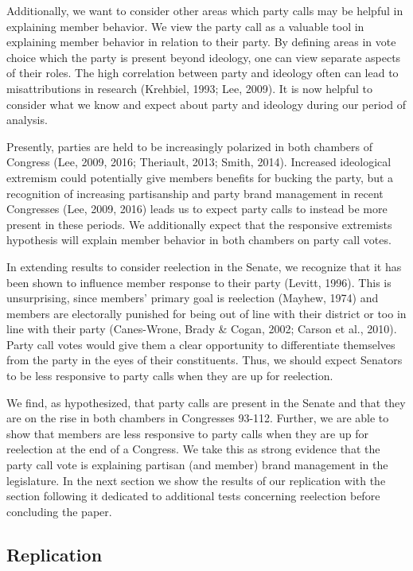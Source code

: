 \documentclass[12pt]{article}
\begin{document}
Additionally, we want to consider other areas which party calls may be helpful in explaining member behavior. We view the party call as a valuable tool in explaining member behavior in relation to their party. By defining areas in vote choice which the party is present beyond ideology, one can view separate aspects of their roles. The high correlation between party and ideology often can lead to misattributions in research (Krehbiel, 1993; Lee, 2009). It is now helpful to consider what we know and expect about party and ideology during our period of analysis.

Presently, parties are held to be increasingly polarized in both chambers of Congress (Lee, 2009, 2016; Theriault, 2013; Smith, 2014). Increased ideological extremism could potentially give members benefits for bucking the party, but a recognition of increasing partisanship and party brand management in recent Congresses (Lee, 2009, 2016) leads us to expect party calls to instead  be more present in these periods. We additionally expect that the responsive extremists hypothesis will explain member behavior in both chambers on party call votes.

In extending results to consider reelection in the Senate, we recognize that it has been shown to influence member response to their party (Levitt, 1996). This is unsurprising, since members' primary goal is reelection (Mayhew, 1974) and members are electorally punished for being out of line with their district or too in line with their party (Canes-Wrone, Brady \& Cogan, 2002; Carson et al., 2010). Party call votes would give them a clear opportunity to differentiate themselves from the party in the eyes of their constituents. Thus, we should expect Senators to be less responsive to party calls when they are up for reelection.

We find, as hypothesized, that party calls are present in the Senate and that they are on the rise in both chambers in Congresses 93-112. Further, we are able to show that members are less responsive to party calls when they are up for reelection at the end of a Congress. We take this as strong evidence that the party call vote is explaining partisan (and member) brand management in the legislature. In the next section we show the results of our replication with the section following it dedicated to additional tests concerning reelection before concluding the paper.

\subsection*{Replication}
\end{document}

